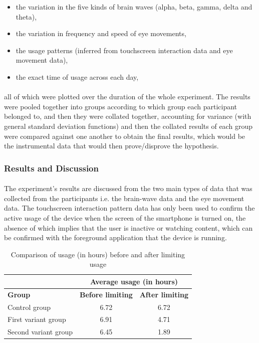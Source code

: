 \documentclass{article}
\begin{document}
\begin{itemize}
    \item the variation in the five kinds of brain waves (alpha, beta, gamma, delta and theta),
    \item the variation in frequency and speed of eye movements,
    \item the usage patterns (inferred from touchscreen interaction data and eye movement data),
    \item the exact time of usage across each day,
\end{itemize}

\paragraph{} all of which were plotted over the duration of the whole experiment. The results were pooled together into groups according to which group each participant belonged to, and then they were collated together, accounting for variance (with general standard deviation functions) and then the collated results of each group were compared against one another to obtain the final results, which would be the instrumental data that would then prove/disprove the hypothesis.

\subsubsection{Results and Discussion}

\paragraph{} The experiment's results are discussed from the two main types of data that was collected from the participants i.e. the brain-wave data and the eye movement data. The touchscreen interaction pattern data has only been used to confirm the active usage of the device when the screen of the smartphone is turned on, the absence of which implies that the user is inactive or watching content, which can be confirmed with the foreground application that the device is running. 
\begin{table}[hbtp]
  \begin{center}
    \begin{tabular}{|l|c|c|}
    \hline
                         & \multicolumn{2}{c|}{\textbf{Average usage (in hours)}}      \\ \hline
    \textbf{Group}       & \textbf{Before limiting}        & \textbf{After limiting}   \\ \hline
    Control group        & 6.72                   & 6.72                               \\ \hline
    First variant group  & 6.91                   & 4.71                               \\ \hline
    Second variant group & 6.45                   & 1.89                               \\ \hline
    \end{tabular}
    \caption{Comparison of usage (in hours) before and after limiting usage}
    \label{tab:tabone}
  \end{center}
\end{table}
\end{document}

